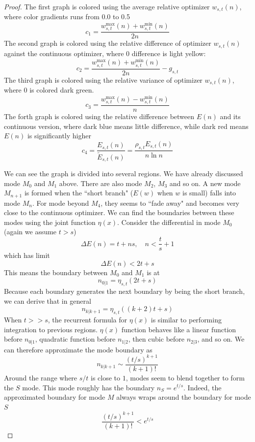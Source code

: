 \documentclass[]{article}
\begin{document}
\begin{proof}
	\vspace{0.3cm}

	The first graph is colored using the average relative optimizer $w_{s,t}(n)$, where color gradients runs from 0.0 to 0.5
	\[
	c_1 = \frac{w^{\max}_{s,t}(n) + w^{\min}_{s,t}(n)}{2n}
	\]
	The second graph is colored using the relative difference of optimizer $w_{s,t}(n)$ against the continuous optimizer, where 0 difference is light yellow:
	\[
	c_2 = \frac{w^{\max}_{s,t}(n) + w^{\min}_{s,t}(n)}{2n} - g_{s,t}
	\]
	The third graph is colored using the relative variance of optimizer $w_{s,t}(n)$, where 0 is colored dark green.
	\[
	c_3 = \frac{w^{\max}_{s,t}(n) - w^{\min}_{s,t}(n)}{n}
	\]
	The forth graph is colored using the relative difference between $E(n)$ and its continuous version, where dark blue means little difference, while dark red means $E(n)$ is significantly higher
	\[
	c_4 =\frac{E_{s,t}(n)} {\tilde{E}_{s,t}(n)} = \frac{\rho_{s,t} E_{s,t}(n)} {n \ln n}
	\]

	We can see the graph is divided into several regions. We have already discussed mode $M_0$ and $M_1$ above. There are also mode $M_2$, $M_3$ and so on. A new mode $M_{n+1}$ is formed when the ``short branch" ($E(w)$ when $w$ is small) falls into mode $M_n$. For mode beyond $M_4$, they seems to ``fade away" and becomes very close to the continuous optimizer. We can find the boundaries between these modes using the joint function $\eta(x)$. Consider the differential in mode $M_0$ (again we assume $t>s$)
	\[
	\Delta E(n) = t + ns, \quad n < \frac{t}{s} + 1
	\]
	which has limit
	\[
	\Delta E(n) < 2t + s
	\]
	This means the boundary between $M_0$ and $M_1$ is at
	\[
	n_{0|1} = \eta_{s,t}(2t + s)
	\]
	Because each boundary generates the next boundary by being the short branch, we can derive that in general
	\[
	n_{k|k+1} = \eta_{s,t}((k+2)t + s)
	\]
	When $t>>s$, the recurrent formula for $\eta(x)$ is similar to performing integration to previous regions. $\eta(x)$ function behaves like a linear function before $n_{0|1}$, quadratic function before $n_{1|2}$, then cubic before $n_{2|3}$, and so on. We can therefore approximate the mode boundary as
	\[
	n_{k|k+1} \sim \frac{(t/s)^{k+1}}{(k+1)!}
	\]
	Around the range where $s/t$ is close to $1$, modes seem to blend together to form the $S$ mode. This mode roughly has the boundary $n_S = e^{t/s}$. Indeed, the approximated boundary for mode $M$ always wraps around the boundary for mode $S$
	\[
	\frac{(t/s)^{k+1}}{(k+1)!} < e^{t/s}
	\]


\end{proof}
\end{document}
